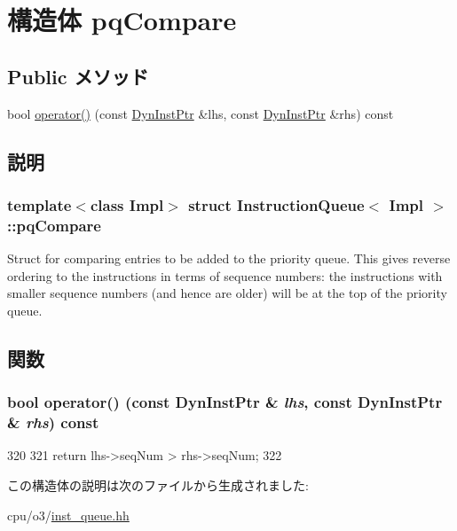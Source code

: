 \hypertarget{structInstructionQueue_1_1pqCompare}{
\section{構造体 pqCompare}
\label{structInstructionQueue_1_1pqCompare}
}
\subsection*{Public メソッド}
\begin{DoxyCompactItemize}
\item 
bool \hyperlink{structInstructionQueue_1_1pqCompare_aa171c804e811b84fcefef511a9031fb6}{operator()} (const \hyperlink{classInstructionQueue_a028ce10889c5f6450239d9e9a7347976}{DynInstPtr} \&lhs, const \hyperlink{classInstructionQueue_a028ce10889c5f6450239d9e9a7347976}{DynInstPtr} \&rhs) const 
\end{DoxyCompactItemize}


\subsection{説明}
\subsubsection*{template$<$class Impl$>$ struct InstructionQueue$<$ Impl $>$::pqCompare}

Struct for comparing entries to be added to the priority queue. This gives reverse ordering to the instructions in terms of sequence numbers: the instructions with smaller sequence numbers (and hence are older) will be at the top of the priority queue. 

\subsection{関数}
\hypertarget{structInstructionQueue_1_1pqCompare_aa171c804e811b84fcefef511a9031fb6}{
\subsubsection[{operator()}]{\setlength{\rightskip}{0pt plus 5cm}bool operator() (const {\bf DynInstPtr} \& {\em lhs}, \/  const {\bf DynInstPtr} \& {\em rhs}) const}}
\label{structInstructionQueue_1_1pqCompare_aa171c804e811b84fcefef511a9031fb6}



\begin{DoxyCode}
320         {
321             return lhs->seqNum > rhs->seqNum;
322         }
\end{DoxyCode}


この構造体の説明は次のファイルから生成されました:\begin{DoxyCompactItemize}
\item 
cpu/o3/\hyperlink{o3_2inst__queue_8hh}{inst\_\-queue.hh}\end{DoxyCompactItemize}
